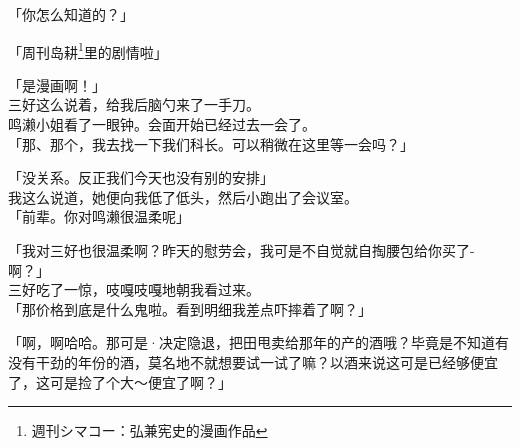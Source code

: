 「你怎么知道的？」

「周刊岛耕\footnote{週刊シマコー：弘兼宪史的漫画作品}里的剧情啦」

「是漫画啊！」\\

三好这么说着，给我后脑勺来了一手刀。\\

鸣濑小姐看了一眼钟。会面开始已经过去一会了。\\

「那、那个，我去找一下我们科长。可以稍微在这里等一会吗？」

「没关系。反正我们今天也没有别的安排」\\

我这么说道，她便向我低了低头，然后小跑出了会议室。\\

「前辈。你对鸣濑很温柔呢」

「我对三好也很温柔啊？昨天的慰劳会，我可是不自觉就自掏腰包给你买了-啊？」\\

三好吃了一惊，吱嘎吱嘎地朝我看过来。\\

「那价格到底是什么鬼啦。看到明细我差点吓摔着了啊？」

「啊，啊哈哈。那可是·决定隐退，把田甩卖给那年的产的酒哦？毕竟是不知道有没有干劲的年份的酒，莫名地不就想要试一试了嘛？以酒来说这可是已经够便宜了，这可是捡了个大～便宜了啊？」

